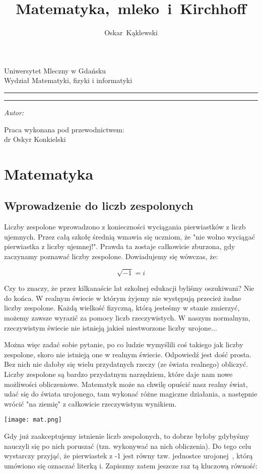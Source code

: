\documentclass[a4paper,12pt]{article}
\author{Oskar~Kąklewski}
\title{\textbf{Matematyka,~mleko~i~Kirchhoff}}
\makeatletter
\newcommand{\linia}{\rule{\linewidth}{0.4mm}}
\renewcommand{\maketitle}{\begin{titlepage}
    \vspace*{1cm}
    \begin{center}\small
    Uniwersytet Mleczny w Gdańsku\\
    Wydział Matematyki, fizyki i informatyki\\
    \end{center}
    \vspace{4cm}
    \noindent\linia
    \begin{center}
      \LARGE \textsc{\@title}
         \end{center}
     \linia
    \vspace{0.5cm}
    \begin{flushright}
    \begin{minipage}{5cm}
    \textit{\small Autor:}\\
    \normalsize \textsc{\@author} \par
    \end{minipage}
    \vspace{2cm}
     {\small Praca wykonana pod przewodnictwem:}\\
         dr Oskyr Konkielski
     \end{flushright}
    \vspace*{\stretch{6}}
    \begin{center}
    \@date
    \end{center}
  \end{titlepage}%
}
\makeatother
\begin{document}
\maketitle
\newpage
\tableofcontents
\newpage
\section{Matematyka}
\subsection{Wprowadzenie do liczb zespolonych}

Liczby zespolone wprowadzono z konieczności wyciągania pierwiastków z liczb ujemnych.
Przez całą szkołę średnią wmawia się uczniom, że "nie wolno wyciągać pierwiastka z liczby ujemnej!". Prawda ta zostaje całkowicie zburzona, gdy zaczynamy poznawać liczby zespolone. Dowiadujemy się wówczas, że:

\begin{equation}
\sqrt{-1}=\textit{i}
\end{equation}

Czy to znaczy, że przez kilkanaście lat szkolnej edukacji byliśmy oszukiwani? Nie do końca. W realnym świecie w którym żyjemy nie występują przecież żadne liczby zespolone. Każdą wielkość fizyczną, którą jesteśmy w stanie zmierzyć, możemy zawsze wyrazić za pomocy liczb rzeczywistych. W naszym normalnym, rzeczywistym świecie nie istnieją jakieś niestworzone liczby urojone...

Można więc zadać sobie pytanie, po co ludzie wymyślili coś takiego jak liczby zespolone, skoro nie istnieją one w realnym świecie. Odpowiedź jest dość prosta. Bez nich nie dałoby się wielu przydatnych rzeczy (ze świata realnego) obliczyć.
Liczby zespolone są bardzo przydatnym narzędziem, które daje nam nowe możliwości obliczeniowe. Matematyk może na chwilę opuścić nasz realny świat, udać się do świata urojonego, tam wykonać różne magiczne działania, a następnie wrócić "na ziemię" z całkowicie rzeczywistym wynikiem.

\texttt{[image: mat.png]}

Gdy już zaakceptujemy istnienie liczb zespolonych, to dobrze byłoby gdybyśmy nauczyli się po nich poruszać (tzn. wykonywać na nich obliczenia). Do tego celu wystarczy przyjąć, że pierwiastek z -1 jest równy tzw. jednostce urojonej~\cite{pa}, którą umówiono się oznaczać literką i. Zapiszmy zatem jeszcze raz tą kluczową równość:
\end{document}
